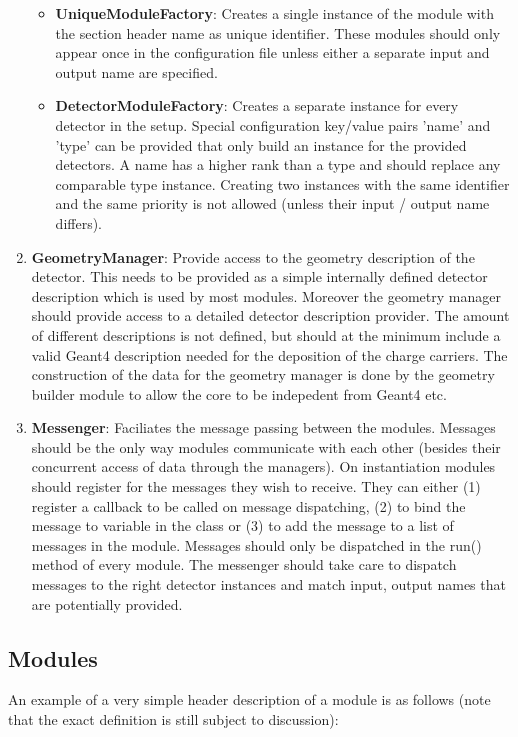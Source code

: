 \begin{enumerate}
\begin{itemize}
\item \textbf{UniqueModuleFactory}: Creates a single instance of the module with the section header name as unique identifier. These modules should only appear once in the configuration file unless either a separate input and output name are specified.
\item \textbf{DetectorModuleFactory}: Creates a separate instance for every detector in the setup. Special configuration key/value pairs 'name' and 'type' can be provided that only build an instance for the provided detectors. A name has a higher rank than a type and should replace any comparable type instance. Creating two instances with the same identifier and the same priority is not allowed (unless their input / output name differs).
\end{itemize}
\item \textbf{GeometryManager}: Provide access to the geometry description of the detector. This needs to be provided as a simple internally defined detector description which is used by most modules. Moreover the geometry manager should provide access to a detailed detector description provider. The amount of different descriptions is not defined, but should at the minimum include a valid Geant4 description needed for the deposition of the charge carriers. The construction of the data for the geometry manager is done by the geometry builder module to allow the core to be indepedent from Geant4 etc.
\item \textbf{Messenger}: Faciliates the message passing between the modules. Messages should be the only way modules communicate with each other (besides their concurrent access of data through the managers). On instantiation modules should register for the messages they wish to receive. They can either (1) register a callback to be called on message dispatching, (2) to bind the message to variable in the class or (3) to add the message to a list of messages in the module. Messages should only be dispatched in the run() method of every module. The messenger should take care to dispatch messages to the right detector instances and match input, output names that are potentially provided.
\end{enumerate}

\subsection{Modules}
An example of a very simple header description of a module is as follows (note that the exact definition is still subject to discussion):

